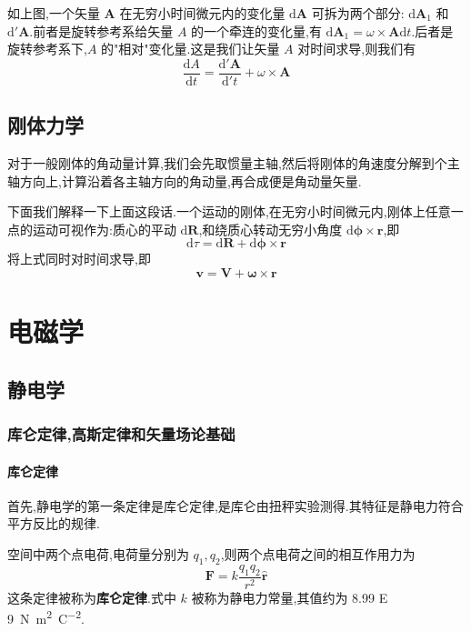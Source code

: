 \documentclass[UTF8]{ctexbook}
\newcommand{\D}{\text{d}}
\newcommand{\derivative}[2]{\frac{\D #1}{\D #2}}
\begin{document}
如上图,一个矢量 $\boldsymbol{A}$ 在无穷小时间微元内的变化量 $\D \boldsymbol{A}$ 可拆为两个部分: $\D \boldsymbol{A}_1$ 和 $\D' \boldsymbol{A}$.前者是旋转参考系给矢量 $A$ 的一个牵连的变化量,有 $\D \boldsymbol{A}_1 = \omega \times \boldsymbol{A} \D t$.后者是旋转参考系下,$A$ 的"相对"变化量.这是我们让矢量 $A$ 对时间求导,则我们有
\[\derivative{A}{t} = \frac{\D' \boldsymbol{A}}{\D' t} + \omega\times \boldsymbol{A}\]

\chapter{刚体力学}

对于一般刚体的角动量计算,我们会先取惯量主轴,然后将刚体的角速度分解到个主轴方向上,计算沿着各主轴方向的角动量,再合成便是角动量矢量.

下面我们解释一下上面这段话.一个运动的刚体,在无穷小时间微元内,刚体上任意一点的运动可视作为:质心的平动 $\D \boldsymbol{R}$,和绕质心转动无穷小角度 $\D \boldsymbol{\phi} \times \boldsymbol{r}$,即
\[\D \tau = \D \boldsymbol{R} + \D \boldsymbol{\phi} \times \boldsymbol{r}\]
将上式同时对时间求导,即
\[\boldsymbol{v} = \boldsymbol{V} + \boldsymbol{\omega} \times \boldsymbol{r}\]

\part{电磁学}

\chapter{静电学}

\section{库仑定律,高斯定律和矢量场论基础}

\subsection{库仑定律}

首先,静电学的第一条定律是库仑定律,是库仑由扭秤实验测得.其特征是静电力符合平方反比的规律.

\begin{law}
    空间中两个点电荷,电荷量分别为 $q_1,q_2$,则两个点电荷之间的相互作用力为
    \begin{equation}
        \boldsymbol{F} = k \frac{q_1q_2}{r^2} \boldsymbol{\hat{r}}
    \end{equation}
    这条定律被称为\textbf{库仑定律}.式中 $k$ 被称为静电力常量,其值约为 \SI{8.99 E 9}{\newton\square\meter\per\square\coulomb}.
\end{law}
\end{document}
